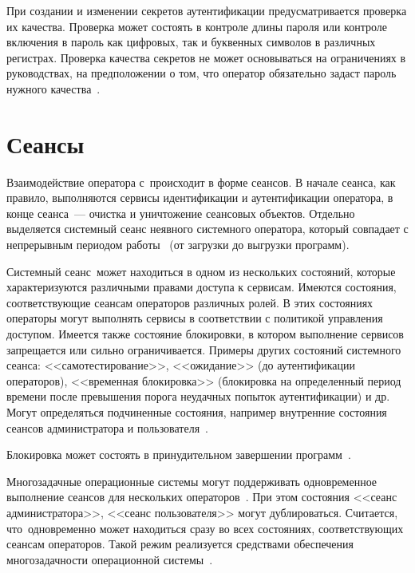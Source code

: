 При создании и изменении секретов аутентификации предусматривается 
проверка их качества. Проверка может состоять в контроле 
длины пароля или контроле включения в пароль как цифровых, 
так и буквенных символов в различных регистрах.
Проверка качества секретов не может основываться на ограничениях 
в руководствах, \ie на предположении о том, что оператор
обязательно задаст пароль нужного качества~.

\section{Сеансы}

Взаимодействие оператора с~\TOE происходит в форме сеансов. 
В начале сеанса, как правило, 
выполняются сервисы идентификации и аутентификации оператора,
в конце сеанса~--- очистка и уничтожение сеансовых объектов.
%
Отдельно выделяется системный сеанс неявного системного оператора,
который совпадает с непрерывным периодом работы~\TOE
(от загрузки до выгрузки программ). 

Системный сеанс~\TOE может находиться в одном из нескольких состояний,
которые характеризуются различными правами доступа к сервисам. 
%
Имеются состояния, соответствующие сеансам операторов различных ролей. 
В этих состояниях операторы могут выполнять сервисы в соответствии 
с политикой управления доступом. 
%
Имеется также состояние блокировки,
в котором выполнение сервисов запрещается или сильно ограничивается.
%
Примеры других состояний системного сеанса:
<<самотестирование>>,
<<ожидание>> (до аутентификации операторов),
<<временная блокировка>> (блокировка на определенный период времени
после превышения порога неудачных попыток аутентификации) и др.
%
Могут определяться подчиненные состояния,
например внутренние состояния сеансов администратора и пользователя~.

Блокировка может состоять в принудительном завершении программ~.

Многозадачные операционные системы могут поддерживать 
одновременное выполнение сеансов для нескольких операторов~\TOE.
При этом состояния <<сеанс администратора>>, 
<<сеанс пользователя>> могут дублироваться. 
Считается, что~\TOE одновременно может находиться
сразу во всех состояниях, соответствующих сеансам операторов. 
Такой режим реализуется средствами обеспечения 
многозадачности операционной системы~.


